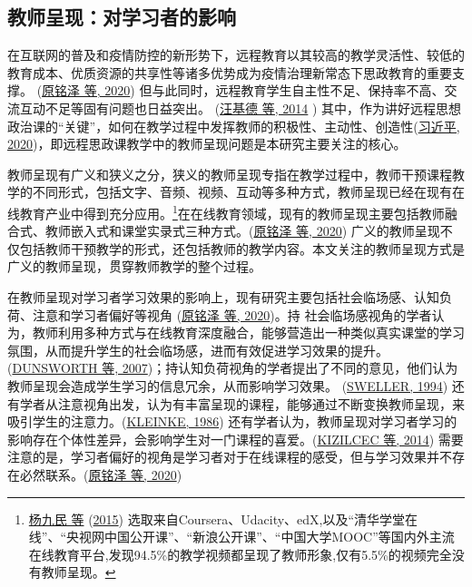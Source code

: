 \documentclass[
  12pt,
]{ctexart}
\begin{document}
\hypertarget{ux6559ux5e08ux5448ux73b0ux5bf9ux5b66ux4e60ux8005ux7684ux5f71ux54cd}{%
\subsection{教师呈现：对学习者的影响}\label{ux6559ux5e08ux5448ux73b0ux5bf9ux5b66ux4e60ux8005ux7684ux5f71ux54cd}}

在互联网的普及和疫情防控的新形势下，远程教育以其较高的教学灵活性、较低的教育成本、优质资源的共享性等诸多优势成为疫情治理新常态下思政教育的重要支撑。 (\protect\hyperlink{ref-YuanMingZeEtAl2020a}{原铭泽 等, 2020}) 但与此同时，远程教育学生自主性不足、保持率不高、交流互动不足等固有问题也日益突出。 (\protect\hyperlink{ref-WangJiDeEtAl2014}{汪基德 等, 2014} ) 其中，作为讲好远程思想政治课的``关键''，如何在教学过程中发挥教师的积极性、主动性、创造性(\protect\hyperlink{ref-XiJinPing2020}{习近平, 2020})，即远程思政课教学中的教师呈现问题是本研究主要关注的核心。

教师呈现有广义和狭义之分，狭义的教师呈现专指在教学过程中，教师干预课程教学的不同形式，包括文字、音频、视频、互动等多种方式，教师呈现已经在现有在线教育产业中得到充分应用。\footnote{\protect\hyperlink{ref-YangJiuMinEtAl2015}{杨九民 等} (\protect\hyperlink{ref-YangJiuMinEtAl2015}{2015}) 选取来自Coursera、Udacity、edX,以及``清华学堂在线''、``央视网中国公开课''、``新浪公开课''、``中国大学MOOC''等国内外主流在线教育平台,发现94.5\%的教学视频都呈现了教师形象,仅有5.5\%的视频完全没有教师呈现。}在在线教育领域，现有的教师呈现主要包括教师融合式、教师嵌入式和课堂实录式三种方式。(\protect\hyperlink{ref-YuanMingZeEtAl2020a}{原铭泽 等, 2020})
广义的教师呈现不仅包括教师干预教学的形式，还包括教师的教学内容。本文关注的教师呈现方式是广义的教师呈现，贯穿教师教学的整个过程。

在教师呈现对学习者学习效果的影响上，现有研究主要包括社会临场感、认知负荷、注意和学习者偏好等视角 (\protect\hyperlink{ref-YuanMingZeEtAl2020a}{原铭泽 等, 2020})。持 社会临场感视角的学者认为，教师利用多种方式与在线教育深度融合，能够营造出一种类似真实课堂的学习氛围，从而提升学生的社会临场感，进而有效促进学习效果的提升。(\protect\hyperlink{ref-DunsworthAtkinson2007}{DUNSWORTH 等, 2007})；持认知负荷视角的学者提出了不同的意见，他们认为教师呈现会造成学生学习的信息冗余，从而影响学习效果。 (\protect\hyperlink{ref-Sweller1994}{SWELLER, 1994}) 还有学者从注意视角出发，认为有丰富呈现的课程，能够通过不断变换教师呈现，来吸引学生的注意力。(\protect\hyperlink{ref-Kleinke1986}{KLEINKE, 1986}) 还有学者认为，教师呈现对学习者学习的影响存在个体性差异，会影响学生对一门课程的喜爱。(\protect\hyperlink{ref-KizilcecEtAl2014}{KIZILCEC 等, 2014}) 需要注意的是，学习者偏好的视角是学习者对于在线课程的感受，但与学习效果并不存在必然联系。(\protect\hyperlink{ref-YuanMingZeEtAl2020a}{原铭泽 等, 2020})
\end{document}
